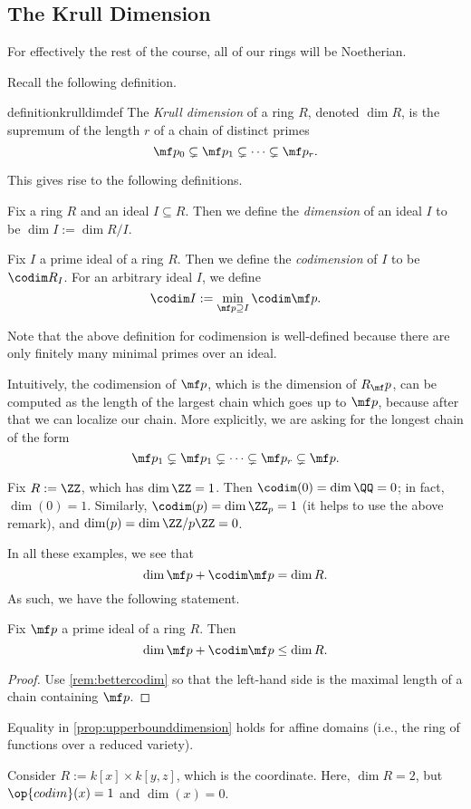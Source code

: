\subsection{The Krull Dimension}
\begin{warn}
	For effectively the rest of the course, all of our rings will be Noetherian.
\end{warn}
Recall the following definition.
\begin{restatable}{definition}{krulldimdef}
	The \textit{Krull dimension} of a ring $R$, denoted $\dim R$, is the supremum of the length $r$ of a chain of distinct primes
	\[\mf p_0\subsetneq\mf p_1\subsetneq\cdots\subsetneq\mf p_r.\]
\end{restatable} %
This gives rise to the following definitions.
\begin{definition}
	Fix a ring $R$ and an ideal $I\subseteq R$. Then we define the \textit{dimension} of an ideal $I$ to be $\dim I:=\dim R/I$.
\end{definition}
\begin{definition}[Codimension]
	Fix $I$ a prime ideal of a ring $R$. Then we define the \textit{codimension} of $I$ to be $\codim R_I$. For an arbitrary ideal $I$, we define
	\[\codim I:=\min_{\mf p\supseteq I}\codim\mf p.\]
\end{definition}
Note that the above definition for codimension is well-defined because there are only finitely many minimal primes over an ideal.
\begin{remark} \label{rem:bettercodim}
	Intuitively, the codimension of $\mf p$, which is the dimension of $R_\mf p$, can be computed as the length of the largest chain which goes up to $\mf p$, because after that we can localize our chain. More explicitly, we are asking for the longest chain of the form
	\[\mf p_1\subsetneq\mf p_1\subsetneq\cdots\subsetneq\mf p_r\subsetneq\mf p.\]
\end{remark}
\begin{example}
	Fix $R:=\ZZ$, which has $\dim\ZZ=1$. Then $\codim(0)=\dim\QQ=0$; in fact, $\dim(0)=1$. Similarly, $\codim(p)=\dim\ZZ_p=1$ (it helps to use the above remark), and $\dim(p)=\dim\ZZ/p\ZZ=0$.
\end{example}
In all these examples, we see that
\[\dim\mf p+\codim\mf p=\dim R.\]
As such, we have the following statement.
\begin{proposition} \label{prop:upperbounddimension}
	Fix $\mf p$ a prime ideal of a ring $R$. Then
	\[\dim\mf p+\codim\mf p\le\dim R.\]
\end{proposition}
\begin{proof}
	Use \autoref{rem:bettercodim} so that the left-hand side is the maximal length of a chain containing $\mf p$.
\end{proof}
\begin{remark}
	Equality in \autoref{prop:upperbounddimension} holds for affine domains (i.e., the ring of functions over a reduced variety).
\end{remark}
\begin{example}
	Consider $R:=k[x]\times k[y,z]$, which is the coordinate. Here, $\dim R=2$, but $\op{codim}(x)=1$ and $\dim(x)=0$.
\end{example}

